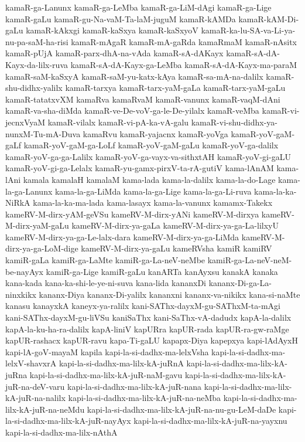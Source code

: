 {kamaR-ga-Lanunx
kamaR-ga-LeMba
kamaR-ga-LiM-dAgi
kamaR-ga-Lige
kamaR-gaLu
kamaR-gu-Na-vaM-Ta-laM-juguM
kamaR-kAMDa
kamaR-kAM-Di-gaLu
kamaR-kAkxgi
kamaR-kaSxya
kamaR-kaSxyoV
kamaR-ka-lu-SA-va-Li-ya-nu-pa-saM-ha-risi
kamaR-mAgaR
kamaR-mA-gaRda
kamaRmaM
kamaR-nAsitx
kamaR-pUjA
kamaR-parx-dhA-na-vAda
kamaR-sA-dAKayx
kamaR-sA-dA-Kayx-da-lilx-ruva
kamaR-sA-dA-Kayx-ga-LeMba
kamaR-sA-dA-Kayx-ma-paraM
kamaR-saM-kaSxyA
kamaR-saM-yu-katx-kAya
kamaR-sa-mA-na-dalilx
kamaR-shu-didhx-yalilx
kamaR-tarxya
kamaR-tarx-yaM-gaLa
kamaR-tarx-yaM-gaLu
kamaR-tatatxvXM
kamaRva
kamaRvaM
kamaR-vanunx
kamaR-vaqM-dAni
kamaR-va-sha-diMda
kamaR-ve-De-voV-ga-le-De-yilalx
kamaR-veMba
kamaR-vi-jecnxVyaM
kamaR-vilalx
kamaR-vi-pA-ka-vA-galu
kamaR-vi-shu-didhx-ya-nunxM-Tu-mA-Duva
kamaRvu
kamaR-yajacnx
kamaR-yoVga
kamaR-yoV-gaM-gaLf
kamaR-yoV-gaM-ga-LoLf
kamaR-yoV-gaM-gaLu
kamaR-yoV-ga-dalilx
kamaR-yoV-ga-ga-Lalilx
kamaR-yoV-ga-vayx-va-sithxtAH
kamaR-yoV-gi-gaLU
kamaR-yoV-gi-ga-Lelalx
kamaR-yu-gamx-pirxV-ta-rA-gutiV
kama-lAnAM
kama-lAni
kamala
kamalaH
kamalaM
kama-lada
kama-la-dalilx
kama-la-do-Lage
kama-la-ga-Lanunx
kama-la-ga-LiMda
kama-la-ga-Lige
kama-la-ga-Li-ruva
kama-la-ka-NiRkA
kama-la-ka-ma-lada
kama-lasayx
kama-la-vanunx
kamamx-Takekx
kameRV-M-dirx-yAM-geVSu
kameRV-M-dirx-yANi
kameRV-M-dirxya
kameRV-M-dirx-yaM-gaLu
kameRV-M-dirx-ya-gaLa
kameRV-M-dirx-ya-ga-La-lilxyU
kameRV-M-dirx-ya-ga-Le-lalx-dara
kameRV-M-dirx-ya-ga-LiMda
kameRV-M-dirx-ya-ga-LoM-dige
kameRV-M-dirx-ya-gaLu
kameRVsha
kamiR
kamiRV
kamiR-gaLa
kamiR-ga-LaMte
kamiR-ga-La-neV-neMbe
kamiR-ga-La-neV-neM-be-nayAyx
kamiR-ga-Lige
kamiR-gaLu
kanARTa
kanAyxsu
kanakA
kanaka
kana-kada
kana-ka-shi-le-ye-ni-suva
kana-lida
kananxDi
kananx-Di-ga-La-ninxkikx
kananx-Diya
kananx-Di-yalilx
kananxni
kananx-va-nikikx
kana-si-naMte
kanasu
kanayxkA
kaneyx-ya-ralilx
kani-SAThx-dayxM-gu-SAThxM-ta-mAgi
kani-SAThx-dayxM-gu-liVSu
kaniSaThx
kani-SaThx-vA-dadudx
kapA-la-dalilx
kapA-la-ku-ha-ra-dalilx
kapA-liniV
kapURra
kapUR-rada
kapUR-ra-gw-raMge
kapUR-rashacx
kapUR-ravu
kapa-Ti-gaLU
kapapx-Diya
kapepxya
kapi-lAdAyxH
kapi-lA-goV-mayaM
kapila
kapi-la-si-dadhx-ma-lelxVsha
kapi-la-si-dadhx-ma-lelxV-shavxrA
kapi-la-si-dadhx-ma-lilx-kA-juRnA
kapi-la-si-dadhx-ma-lilx-kA-juRna
kapi-la-si-dadhx-ma-lilx-kA-juR-naM-gavu
kapi-la-si-dadhx-ma-lilx-kA-juR-na-deV-varu
kapi-la-si-dadhx-ma-lilx-kA-juR-nana
kapi-la-si-dadhx-ma-lilx-kA-juR-na-nalilx
kapi-la-si-dadhx-ma-lilx-kA-juR-na-neMba
kapi-la-si-dadhx-ma-lilx-kA-juR-na-neMdu
kapi-la-si-dadhx-ma-lilx-kA-juR-na-nu-gu-LeM-daDe
kapi-la-si-dadhx-ma-lilx-kA-juR-nayAyx
kapi-la-si-dadhx-ma-lilx-kA-juR-na-yayxnu
kapi-la-si-dadhx-ma-lilx-nAthA
}
